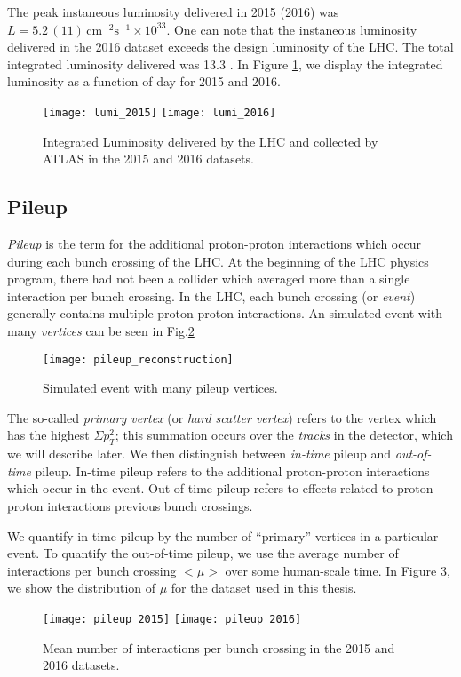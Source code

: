 The peak instaneous luminosity delivered in 2015 (2016) was $L = 5.2 \, (11) \, \text{cm}^{-2} \text{s}^{-1} \times 10^{33} $.
One can note that the instaneous luminosity delivered in the 2016 dataset exceeds the design luminosity of the LHC.
The total integrated luminosity delivered was 13.3 \ifb.
In Figure \ref{fig:lumi}, we display the integrated luminosity as a function of day for 2015 and 2016.
\begin{figure}
\caption{Integrated Luminosity delivered by the LHC and collected by ATLAS in the 2015 and 2016 datasets.}\label{fig:lumi}
\texttt{[image: lumi\_2015]}
\texttt{[image: lumi\_2016]}
\end{figure}

\subsection{Pileup}

\textit{Pileup} is the term for the additional proton-proton interactions which occur during each bunch crossing of the LHC.
At the beginning of the LHC physics program, there had not been a collider which averaged more than a single interaction per bunch crossing.
In the LHC, each bunch crossing (or \textit{event})  generally contains multiple proton-proton interactions.
An simulated event with many \textit{vertices} can be seen in Fig.\ref{fig:pileup_reconstruction}
\begin{figure}
\caption{Simulated event with many pileup vertices.}\label{fig:pileup_reconstruction}
\texttt{[image: pileup\_reconstruction]}
\end{figure}
The so-called \textit{primary vertex} (or \textit{hard scatter vertex}) refers to the vertex which has the highest $\Sigma p_T^2$;  this summation occurs over the \textit{tracks} in the detector, which we will describe later.
We then distinguish between \textit{in-time} pileup and \textit{out-of-time} pileup.
In-time pileup refers to the additional proton-proton interactions which occur in the event.
Out-of-time pileup refers to effects related to proton-proton interactions previous bunch crossings.

We quantify in-time pileup by the number of ``primary''\footnotemark \xspace vertices in a particular event.
To quantify the out-of-time pileup, we use the average number of interactions per bunch crossing $<\mu>$ over some human-scale time.
In Figure \ref{fig:pileup}, we show the distribution of $\mu$ for the dataset used in this thesis.
\begin{figure}
\caption{Mean number of interactions per bunch crossing in the 2015 and 2016 datasets.}\label{fig:pileup}
\texttt{[image: pileup\_2015]}
\texttt{[image: pileup\_2016]}
\end{figure}

